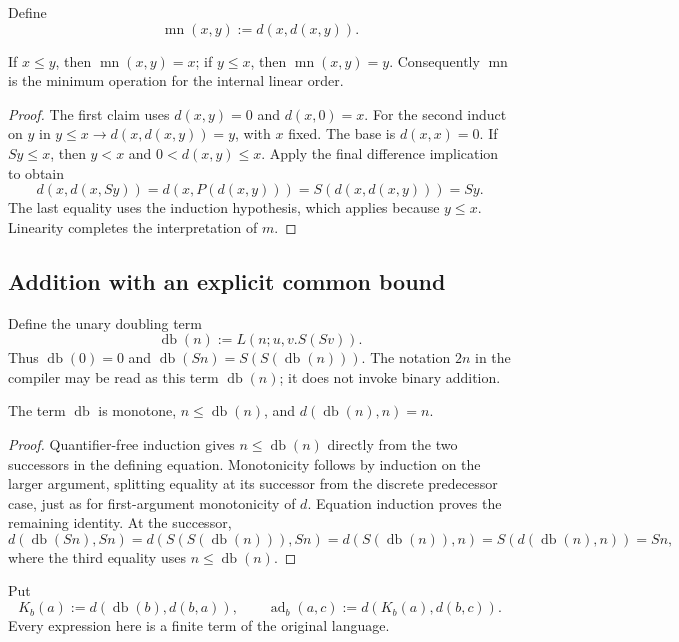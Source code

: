 Define
\[
                      \operatorname{mn}(x,y):=d(x,d(x,y)).
\]

\begin{lemma}[Minimum]
\label{lem:internal-minimum}
If $x\le y$, then $\operatorname{mn}(x,y)=x$; if $y\le x$, then $\operatorname{mn}(x,y)=y$.
Consequently $\operatorname{mn}$ is the minimum operation for the internal linear order.
\end{lemma}
\begin{proof}
The first claim uses $d(x,y)=0$ and $d(x,0)=x$.
For the second induct on $y$ in
$y\le x\to d(x,d(x,y))=y$, with $x$ fixed.
The base is $d(x,x)=0$.  If $Sy\le x$, then $y<x$ and
$0<d(x,y)\le x$.  Apply the final difference implication to obtain
\[
 d(x,d(x,Sy))
   =d(x,P(d(x,y)))
   =S(d(x,d(x,y)))=Sy.
\]
The last equality uses the induction hypothesis, which applies because
$y\le x$.  Linearity completes the interpretation of $m$.
\end{proof}

\subsection{Addition with an explicit common bound}

Define the unary doubling term
\[
             \operatorname{db}(n):=L(n;u,v.S(Sv)).
\]
Thus $\operatorname{db}(0)=0$ and $\operatorname{db}(Sn)=S(S(\operatorname{db}(n)))$.  The notation $2n$ in the compiler
may be read as this term $\operatorname{db}(n)$; it does not invoke binary addition.

\begin{lemma}
\label{lem:internal-doubling}
The term $\operatorname{db}$ is monotone, $n\le \operatorname{db}(n)$, and $d(\operatorname{db}(n),n)=n$.
\end{lemma}
\begin{proof}
Quantifier-free induction gives $n\le \operatorname{db}(n)$ directly from the two
successors in the defining equation.  Monotonicity follows by induction
on the larger argument, splitting equality at its successor from the
discrete predecessor case, just as for first-argument monotonicity of $d$.
Equation induction proves the remaining identity.  At the successor,
\[
 d(\operatorname{db}(Sn),Sn)
   =d(S(S(\operatorname{db}(n))),Sn)=d(S(\operatorname{db}(n)),n)
   =S(d(\operatorname{db}(n),n))=Sn,
\]
where the third equality uses $n\le \operatorname{db}(n)$.
\end{proof}

Put
\[
 K_b(a):=d(\operatorname{db}(b),d(b,a)),\qquad
 \operatorname{ad}_b(a,c):=d(K_b(a),d(b,c)).
 \tag{Bounded addition}\label{eq:internal-bounded-addition}
\]
Every expression here is a finite term of the original language.

